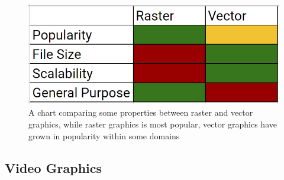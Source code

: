 \documentclass[12pt]{article}
\begin{document}
    \bigskip
    \begin{figure}[h]
        \centering
        \includegraphics[scale=0.6]{Comparison.png}
        \caption[Comparison]{A chart comparing some properties between raster and vector graphics, while raster
        graphics is most popular, vector graphics have grown in popularity within some domains}
        \label{fig:comparison}
    \end{figure}

    \subsection{Video Graphics}\label{subsec:video-graphics}
\end{document}
